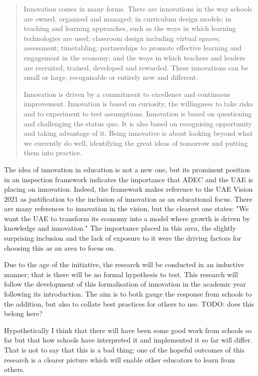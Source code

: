 \begin{quote}
Innovation comes in many forms. There are innovations in the way schools are owned, organised and managed; in curriculum design models; in teaching and learning approaches, such as the ways in which learning technologies are used; classroom design including virtual spaces; assessment; timetabling; partnerships to promote effective learning and engagement in the economy; and the ways in which teachers and leaders are recruited, trained, developed and rewarded. These innovations can be small or large, recognisable or entirely new and different.

Innovation is driven by a commitment to excellence and continuous improvement. Innovation is based on curiosity, the willingness to take risks and to experiment to test assumptions. Innovation is based on questioning and challenging the status quo. It is also based on recognising opportunity and taking advantage of it. Being innovative is about looking beyond what we currently do well, identifying the great ideas of tomorrow and putting them into practice.
\end{quote} \cite[p.12]{ADEC2015}

The idea of innovation in education is not a new one, but its prominent position in an inspection framework indicates the importance that ADEC and the UAE is placing on innovation. Indeed, the framework makes reference to the UAE Vision 2021 as justification to the inclusion of innovation as an educational focus. There are many references to innovation in the vision, but the clearest one states: "We want the UAE to transform its economy into a model where growth is driven by knowledge and innovation." \cite{UAEGovernment2012} The importance placed in this area, the slightly surprising inclusion and the lack of exposure to it were the driving factors for choosing this as an area to focus on.

Due to the age of the initiative, the research will be conducted in an inductive manner; that is there will be no formal hypothesis to test. This research will follow the development of this formalisation of innovation in the academic year following its introduction. The aim is to both gauge the response from schools to the addition, but also to collate best practices for others to use. TODO: does this belong here?


Hypothetically I think that there will have been some good work from schools so far but that how schools have interpreted it and implemented it so far will differ. That is not to say that this is a bad thing; one of the hopeful outcomes of this research is a clearer picture which will enable other educators to learn from others.

